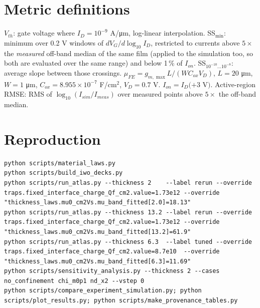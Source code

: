\documentclass[11pt,a4paper]{article}
\newcommand{\um}{\si{\micro\metre}}
\newcommand{\Aum}{A/\si{\micro\metre}}
\begin{document}
\section{Metric definitions}\label{app:metrics}
$V_{th}$: gate voltage where $I_D=10^{-9}$ \Aum, log-linear interpolation. SS$_{\min}$: minimum over 0.2 V windows of $dV_G/d\log_{10}I_D$, restricted to currents above $5\times$ the \emph{measured} off-band median of the same film (applied to the simulation too, so both are evaluated over the same range) and below 1\,\% of $I_{on}$. SS$_{10^{-10}\ldots10^{-8}}$: average slope between those crossings. $\mu_{FE}=g_{m,\max}L/(WC_{ox}V_D)$, $L=20$ \um, $W=1$ \um, $C_{ox}=8.955\times10^{-7}$ F/cm$^2$, $V_D=0.7$ V. $I_{on}=I_D(+3$ V$)$. Active-region RMSE: RMS of $\log_{10}(I_{sim}/I_{meas})$ over measured points above $5\times$ the off-band median.

\section{Reproduction}
\begin{lstlisting}
python scripts/material_laws.py
python scripts/build_iwo_decks.py
python scripts/run_atlas.py --thickness 2    --label rerun --override traps.fixed_interface_charge_Qf_cm2.value=1.73e12 --override "thickness_laws.mu0_cm2Vs.mu_band_fitted[2.0]=18.13"
python scripts/run_atlas.py --thickness 13.2 --label rerun --override traps.fixed_interface_charge_Qf_cm2.value=1.73e12 --override "thickness_laws.mu0_cm2Vs.mu_band_fitted[13.2]=61.9"
python scripts/run_atlas.py --thickness 6.3  --label tuned --override traps.fixed_interface_charge_Qf_cm2.value=8.7e10  --override "thickness_laws.mu0_cm2Vs.mu_band_fitted[6.3]=11.69"
python scripts/sensitivity_analysis.py --thickness 2 --cases no_confinement chi_m0p1 nd_x2 --vstep 0
python scripts/compare_experiment_simulation.py; python scripts/plot_results.py; python scripts/make_provenance_tables.py
\end{lstlisting}
\end{document}
